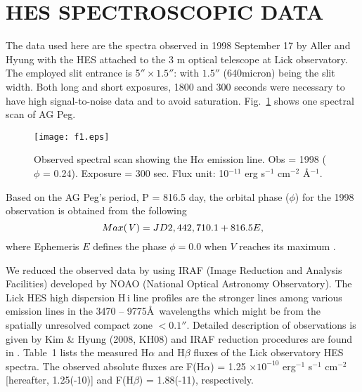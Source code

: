 \documentclass[a4paper,fleqn,usenatbib,useAMS]{mnras}
\def\eg{{\it e.g.,} }
\def\ha{H{$\alpha$}}
\def\hb{H{$\beta$}}
\def\hi{H\,{\sc i}}
\begin{document}
\section{HES SPECTROSCOPIC DATA}

The data used here are the spectra observed in 1998 September 17 by Aller and Hyung with the HES attached to the 3 m optical telescope at  Lick observatory. The employed slit entrance is 5$'' \times 1.5''$: with $1.5''$ (640micron) being the slit width.
Both long and short exposures, 1800 and 300 seconds were necessary to have high signal-to-noise data and to avoid  saturation. Fig.~\ref{fig1} shows one spectral scan of AG Peg.


\begin{figure}
\texttt{[image: f1.eps]}
\caption{Observed spectral scan showing the {\ha} emission line. Obs = 1998 ($\phi$ = 0.24). Exposure = 300 sec.  Flux unit: 10$^{-11}$ erg s$^{-1}$ cm$^{-2}$ \AA$^{-1}$.}
\label{fig1}
\end{figure}

Based on the AG Peg's period, P = 816.5 day, the orbital phase ($\phi$) for the 1998 observation is obtained from the following
$$
Max {\it (V)} = JD 2,442,710.1 + 816.5  E,
$$
where Ephemeris $E$ defines the phase $\phi = 0.0 $  when $V$ reaches its maximum \citep{fer85, ibe96}.

We reduced the observed data by using IRAF (Image Reduction and Analysis Facilities) developed by NOAO (National Optical Astronomy Observatory). The  Lick HES high dispersion {\hi} line profiles are the stronger lines among various emission lines in the 3470 -- 9775\AA\, wavelengths which might be from the spatially unresolved compact zone  $<0.1''$. Detailed  description of observations is given by Kim \& Hyung (2008, KH08) and IRAF reduction procedures are found in \citet{hyu94}.  Table~1 lists the measured  {\ha} and {\hb} fluxes of the Lick observatory HES spectra. The observed absolute fluxes are F({\ha}) = 1.25 $\times 10^{-10}$  erg$^{-1}$ s$^{-1}$ cm$^{-2}$ [hereafter, 1.25(-10)] and F({\hb}) = 1.88(-11), respectively.

\end{document}
